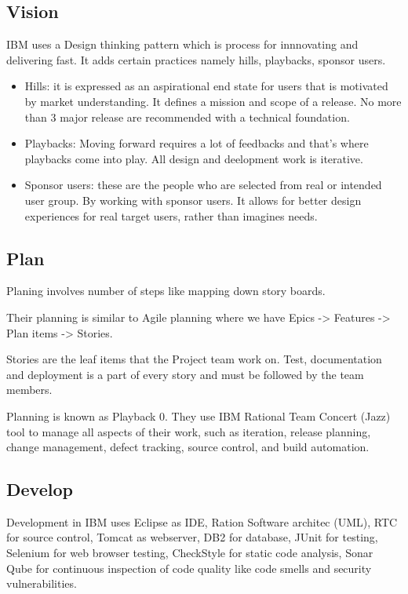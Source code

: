 \documentclass[12pt]{article}
\begin{document}
\subsection{Vision}

IBM uses a Design thinking pattern which is process for innnovating and delivering fast. It adds certain practices namely hills, playbacks, sponsor users.

\begin{itemize}
    \item Hills: it is expressed as an aspirational end state for users that is motivated by market understanding. It defines a mission and scope of a release. No more than 3 major release are recommended with a technical foundation.
    \item Playbacks: Moving forward requires a lot of feedbacks and that's where playbacks come into play. All design and deelopment work is iterative.
    \item Sponsor users: these are the people who are selected from real or intended user group. By working with sponsor users. It allows for better design experiences for real target users, rather than imagines needs.
\end{itemize}

\subsection{Plan}

Planing involves number of steps like mapping down story boards.

Their planning is similar to Agile planning where we have Epics -> Features -> Plan items -> Stories.

Stories are the leaf items that the Project team work on. Test, documentation and deployment is a part of every story and must be followed by the team members.

Planning is known as Playback 0. They use IBM Rational Team Concert (Jazz) tool to manage all aspects of their work, such as iteration, release planning, change management, defect tracking, source control, and build automation.

\subsection{Develop}

Development in IBM uses Eclipse as IDE, Ration Software architec (UML), RTC for source control, Tomcat as webserver, DB2 for database, JUnit for testing, Selenium for web browser testing, CheckStyle for static code analysis, Sonar Qube for continuous inspection of code quality like code smells and security vulnerabilities.
\end{document}
